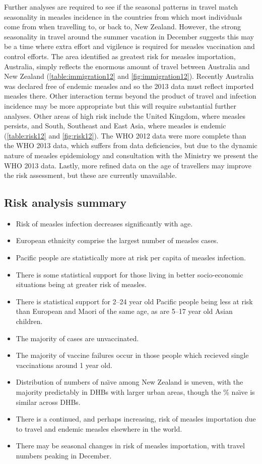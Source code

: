 \documentclass{article}
\begin{document}
Further analyses are required to see if the seasonal patterns in travel match seasonality in measles incidence in the countries from which most individuals come from when travelling to, or back to, New Zealand. However, the strong seasonality in travel around the summer vacation in December suggests this may be a time where extra effort and vigilence is required for measles vaccination and control efforts. The area identified as greatest risk for measles importation, Australia, simply reflects the enormous amount of travel between Australia and New Zealand (\autoref{table:immigration12} and \autoref{fig:immigration12}). Recently Australia was declared free of endemic measles and so the 2013 data must reflect imported measles there. Other interaction terms beyond the product of travel and infection incidence may be more appropriate but this will require substantial further analyses. Other areas of high risk include the United Kingdom, where measles persists, and South, Southeast and East Asia, where measles is endemic (\autoref{table:risk12} and \autoref{fig:risk12}). The WHO 2012 data were more complete than the WHO 2013 data, which suffers from data deficiencies, but due to the dynamic nature of measles epidemiology and consultation with the Ministry we present the WHO 2013 data. Lastly, more refined data on the age of travellers may improve the risk assessment, but these are currently unavailable.

\subsection{Risk analysis summary}
\begin{itemize}
\item Risk of measles infection decreases significantly with age.
\item European ethnicity comprise the largest number of measles cases.
\item Pacific people are statistically more at risk per capita of measles infection.
\item There is some statistical support for those living in better socio-economic situations being at greater risk of measles.
\item There is statistical support for 2--24 year old Pacific people being less at risk than European and Maori of the same age, as are 5--17 year old Asian children.
\item The majority of cases are unvaccinated.
\item The majority of vaccine failures occur in those people which recieved single vaccinations around 1 year old.
\item Distribution of numbers of na\"{\i}ve among New Zealand is uneven, with the majority predictably in DHBs with larger urban areas, though the \%  na\"{\i}ve is similar across DHBs.
\item There is a continued, and perhaps increasing, risk of measles importation due to travel and endemic measles elsewhere in the world.
\item There may be seasonal changes in risk of measles importation, with travel numbers peaking in December.
\end{itemize}
\end{document}
